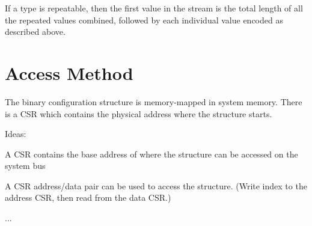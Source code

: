 If a type is repeatable, then the first value in the stream is the total
length of all the repeated values combined, followed by each individual value
encoded as described above.

\chapter{Access Method}
\label{sec:AccessMethod}

The binary configuration structure is memory-mapped in system memory. There
is a CSR which contains the physical address where the structure starts.

\begin{steps}{Ideas:}
\item A CSR contains the base address of where the structure can be accessed on
the system bus
\item A CSR address/data pair can be used to access the structure. (Write index
to the address CSR, then read from the data CSR.)
\item ...
\end{steps}